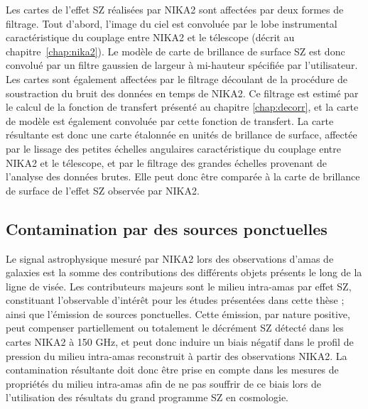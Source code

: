 Les cartes de l'effet SZ réalisées par NIKA2 sont affectées par deux formes de filtrage.
Tout d'abord, l'image du ciel est convoluée par le lobe instrumental caractéristique du couplage entre NIKA2 et le télescope (décrit au chapitre~\ref{chap:nika2}).
Le modèle de carte de brillance de surface SZ est donc convolué par un filtre gaussien de largeur à mi-hauteur spécifiée par l'utilisateur.
Les cartes sont également affectées par le filtrage découlant de la procédure de soustraction du bruit des données en temps de NIKA2.
Ce filtrage est estimé par le calcul de la fonction de transfert présenté au chapitre \ref{chap:decorr}, et la carte de modèle est également convoluée par cette fonction de transfert.
La carte résultante est donc une carte étalonnée en unités de brillance de surface, affectée par le lissage des petites échelles angulaires caractéristique du couplage entre NIKA2 et le télescope, et par le filtrage des grandes échelles provenant de l'analyse des données brutes.
Elle peut donc être comparée à la carte de brillance de surface de l'effet SZ observée par NIKA2.

\subsection{Contamination par des sources ponctuelles}\label{sec:panco_ps}

Le signal astrophysique mesuré par NIKA2 lors des observations d'amas de galaxies est la somme des contributions des différents objets présents le long de la ligne de visée.
Les contributeurs majeurs sont le milieu intra-amas par effet SZ, constituant l'observable d'intérêt pour les études présentées dans cette thèse ; ainsi que l'émission de sources ponctuelles.
Cette émission, par nature positive, peut compenser partiellement ou totalement le décrément SZ détecté dans les cartes NIKA2 à 150 GHz, et peut donc induire un biais négatif dans le profil de pression du milieu intra-amas reconstruit à partir des observations NIKA2.
La contamination résultante doit donc être prise en compte dans les mesures de propriétés du milieu intra-amas afin de ne pas souffrir de ce biais lors de l'utilisation des résultats du grand programme SZ en cosmologie.

